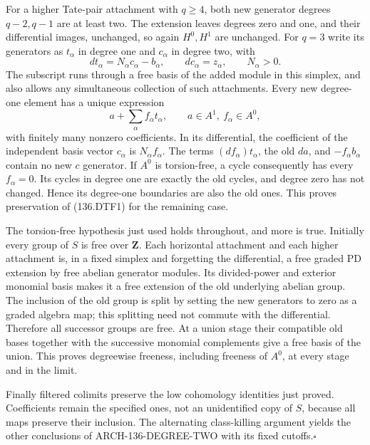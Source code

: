 For a higher Tate-pair attachment with $q\geq4$, both new generator
degrees $q-2,q-1$ are at least two.  The extension leaves degrees
zero and one, and their differential images, unchanged, so again
$H^0,H^1$ are unchanged.
For $q=3$ write its generators as $t_\alpha$ in degree one and
$c_\alpha$ in degree two, with
\[
             dt_\alpha=N_\alpha c_\alpha-b_\alpha,
             \qquad dc_\alpha=z_\alpha,
             \qquad N_\alpha>0.
\]
The subscript runs through a free basis of the added module in
this simplex, and also allows any simultaneous collection of such
attachments.  Every new degree-one element has a unique expression
\[
                 a+\sum_\alpha f_\alpha t_\alpha,
                       \qquad a\in A^1,\ f_\alpha\in A^0,
\]
with finitely many nonzero coefficients.  In its differential,
the coefficient of the independent basis vector $c_\alpha$ is
$N_\alpha f_\alpha$.  The terms $(df_\alpha)t_\alpha$, the old
$d a$, and $-f_\alpha b_\alpha$ contain no new $c$ generator.
If $A^0$ is torsion-free, a cycle consequently has every
$f_\alpha=0$.  Its cycles in degree one are exactly the old cycles,
and degree zero has not changed.  Hence its degree-one boundaries
are also the old ones.  This proves preservation of (136.DTF1)
for the remaining case.

The torsion-free hypothesis just used holds throughout, and more
is true.  Initially every group of $S$ is free over $\mathbf Z$.
Each horizontal attachment and each higher attachment is, in a
fixed simplex and forgetting the differential, a free graded PD
extension by free abelian generator modules.  Its divided-power
and exterior monomial basis makes it a free extension of the old
underlying abelian group.  The inclusion of the old group is split
by setting the new generators to zero as a graded algebra map;
this splitting need not commute with the differential.  Therefore
all successor groups are free.  At a union stage their compatible
old bases together with the successive monomial complements give
a free basis of the union.  This proves degreewise freeness,
including freeness of $A^0$, at every stage and in the limit.

Finally filtered colimits preserve the low cohomology identities
just proved.  Coefficients remain the specified ones, not an
unidentified copy of $S$, because all maps preserve their inclusion.
The alternating class-killing argument yields the other conclusions
of ARCH-136-DEGREE-TWO with its fixed cutoffs.\hfill$\square$
